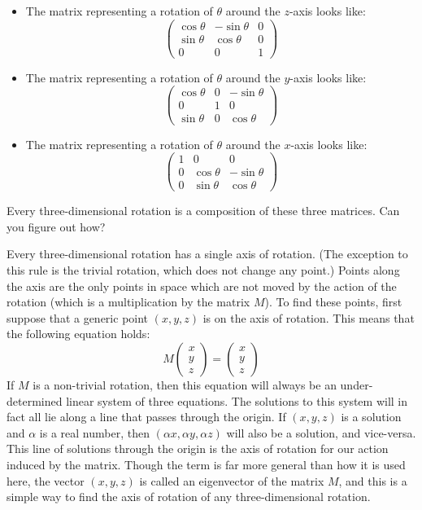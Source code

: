 \begin{itemize}
\item The matrix representing a rotation of $\theta$ around the $z$-axis looks like:
\[
\begin{pmatrix} \cos \theta & - \sin \theta & 0 \\ \sin \theta & \cos \theta & 0 \\ 0 & 0 & 1 \end{pmatrix}
\]
\item The matrix representing a rotation of $\theta$ around the $y$-axis looks like:
\[
\begin{pmatrix} \cos \theta & 0 & -\sin \theta \\ 0 & 1 & 0 \\ \sin \theta & 0 & \cos \theta \end{pmatrix}
\]
\item The matrix representing a rotation of $\theta$ around the $x$-axis looks like:
\[
\begin{pmatrix} 1 &  0 & 0 \\ 0 & \cos \theta & -\sin \theta \\ 0 & \sin \theta & \cos \theta \end{pmatrix}
\]
\end{itemize}

Every three-dimensional rotation is a composition of these three matrices. Can you figure out how? \\


Every three-dimensional rotation has a single axis of rotation. (The exception to this rule is the trivial rotation, which does not change any point.) Points along the axis are the only points in space which are not moved by the action of the rotation (which is a multiplication by the matrix $M$). To find these points, first suppose that a generic point $(x,y,z)$ is on the axis of rotation. This means that the following equation holds:
\[
M \begin{pmatrix} x \\ y \\ z \end{pmatrix} = \begin{pmatrix} x \\ y \\ z \end{pmatrix}
\]
If $M$ is a non-trivial rotation, then this equation will always be an under-determined linear system of three equations. The solutions to this system will in fact all lie along a line that passes through the origin. If $(x,y,z)$ is a solution and $\alpha$ is a real number, then $(\alpha x, \alpha y, \alpha z)$ will also be a solution, and vice-versa. This line of solutions through the origin is the axis of rotation for our action induced by the matrix. Though the term is far more general than how it is used here, the vector $(x,y,z)$ is called an eigenvector of the matrix $M$, and this is a simple way to find the axis of rotation of any three-dimensional rotation. \\

